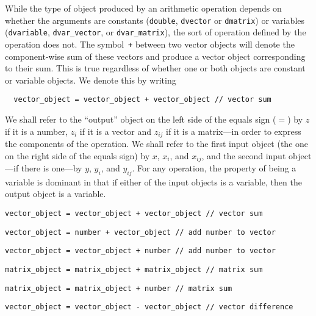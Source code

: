 \documentclass{admbmanual}
\begin{document}
While the type of object produced by an arithmetic operation depends on whether
the arguments are constants (\texttt{double}, \texttt{dvector} or
\texttt{dmatrix}) or variables (\texttt{dvariable}, \texttt{dvar\_vector}, or
\texttt{dvar\_matrix}), the sort of operation defined by the operation does not.
The symbol~\texttt{+} between two vector objects will denote the component-wise
sum of these vectors and produce a vector object corresponding to their sum.
This is true regardless of whether one or both objects are constant or variable
objects. We denote this by writing
\begin{lstlisting}
  vector_object = vector_object + vector_object // vector sum
\end{lstlisting}

We shall refer to the ``output'' object on the left side of the equals sign
($=$) by $z$ if it is a number, $z_i$ if it is a vector and $z_{ij}$ if it is a
matrix---in order to express the components of the operation. We shall refer to
the first input object (the one on the right side of the equals sign) by $x$,
$x_i$, and $x_{ij}$, and the second input object---if there is one---by $y$,
$y_i$, and $y_{ij}$. For any operation, the property of being a variable is
dominant in that if either of the input objects is a variable, then the output
object is a variable.
\begin{lstlisting}
vector_object = vector_object + vector_object // vector sum
\end{lstlisting}
\begin{lstlisting}
vector_object = number + vector_object // add number to vector
\end{lstlisting}
\begin{lstlisting}
vector_object = vector_object + number // add number to vector
\end{lstlisting}
\begin{lstlisting}
matrix_object = matrix_object + matrix_object // matrix sum
\end{lstlisting}
\begin{lstlisting}
matrix_object = matrix_object + number // matrix sum
\end{lstlisting}
\begin{lstlisting}
vector_object = vector_object - vector_object // vector difference
\end{lstlisting}
\end{document}
